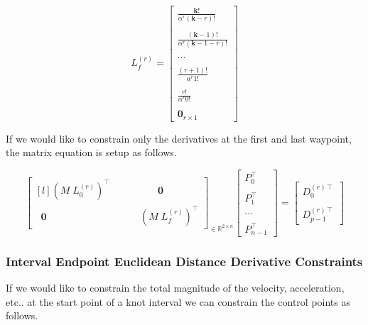 \documentclass{article}
\begin{document}
\begin{equation}
L_f^{(r)} = \begin{bmatrix}
    \frac{\textbf{k}!}{ \alpha^{r} (\textbf{k}-r)!} \\ \\ 
    \frac{ (\textbf{k}-1)!}{ \alpha^{r} (\textbf{k}-1-r)!} \\ \\ 
    ... \\ \\ 
    \frac{(r+1)!}{\alpha^{r} 1!} \\ \\ 
    \frac{r!}{\alpha^r 0!} \\ \\ 
    \textbf{0}_{r \times 1} \end{bmatrix}
\end{equation}

If we would like to constrain only the derivatives at the first and last waypoint, the matrix equation is setup as follows.

\begin{equation}
    \begin{bmatrix*}[l] (M \; L_0^{(r)})^{\intercal} & \qquad \qquad \textbf{0} \\
    \;\; \textbf{0} & \;\;\;\;\;\;\;\; (M \; L_f^{(r)})^{\intercal}
    \end{bmatrix*}_{\in \mathbb{R}^{2 \times n}} 
    \begin{bmatrix}
        P_0^{\intercal} \\\\ P_1^\intercal \\\\ ... \\\\ P_{n-1}^\intercal
    \end{bmatrix} = 
    \begin{bmatrix} D_0^{(r)\intercal} \\\\ D_{p-1}^{(r)\intercal} \end{bmatrix}
\end{equation}

\subsubsection{Interval Endpoint Euclidean Distance Derivative Constraints}

If we would like to constrain the total magnitude of the velocity, acceleration, etc.. at the start point of a knot interval we can constrain the control points as follows.
\end{document}
